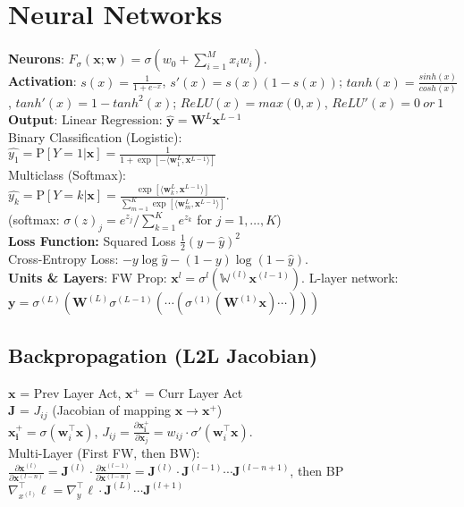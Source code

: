 \section{Neural Networks}
\textbf{Neurons}: $F_\sigma(\mathbf{x};\mathbf{w}) = \sigma(w_0 + \sum_{i=1}^M{x_iw_i})$.\\
\textbf{Activation}: $s(x)=\frac{1}{1+e^{-x}}$, $s'(x)=s(x)(1-s(x))$; $tanh(x) = \tfrac{sinh(x)}{cosh(x)}$, $tanh'(x) = 1 - tanh^2(x)$;  $ReLU(x) = max(0, x)$, $ReLU'(x) = 0\  or\  1$\\
\textbf{Output}: Linear Regression: $\hat{\mathbf{y}} = \mathbf{W}^L\mathbf{x}^{L-1}$\\
Binary Classification (Logistic):\\
$\hat{y_1} = \text{P}[Y=1|\mathbf{x}] = \frac{1}{1 + \exp[-\langle \mathbf{w}_1^L,\mathbf{x}^{L-1}\rangle]}$\\
Multiclass (Softmax):\\
$\hat{y_k} = \text{P}[Y=k|\mathbf{x}]= \frac{\exp[\langle \mathbf{w}_k^L,\mathbf{x}^{L-1}\rangle]}{\sum_{m=1}^{K}{\exp[\langle \mathbf{w}_m^L, \mathbf{x}^{L-1}\rangle]}}$.\\
(softmax: $\sigma(z)_j = e^{z_j}/\sum_{k=1}^K e^{z_k}$ for $j=1,\dots,K$)\\
\textbf{Loss Function:} Squared Loss $\frac{1}{2}(y - \hat{y})^2$\\
Cross-Entropy Loss: $-y \log \hat{y} - (1-y)\log(1-\hat{y})$.\\
\textbf{Units \& Layers}: FW Prop: $\mathbf{x}^{l} = \sigma^{l}\left(\mathbb{W}^{\left(l\right)}\mathbf{x}^{\left(l-1\right)}\right)$. L-layer network: $\mathbf{y}=\sigma^{\left(L\right)}\left(\mathbf{W}^{(L)}\sigma^{(L-1)}\left(\cdots\left(\sigma^{(1)}\left(\mathbf{W}^{(1)}\mathbf{x}\right)\cdots\right)\right)\right)$

\subsection*{Backpropagation (L2L Jacobian)}
$\mathbf{x}$ = Prev Layer Act, $\mathbf{x^+}$ = Curr Layer Act\\$\mathbf{J}$ = $J_{ij}$ (Jacobian of mapping $\mathbf{x}\rightarrow\mathbf{x^+}$)\\ $\mathbf{x_i^+} = \sigma(\mathbf{w}_i^\top\mathbf{x})$, $J_{ij} = \frac{\partial \mathbf{x_i^+}}{\partial \mathbf{x}_j} = w_{ij}\cdot\sigma'(\mathbf{w}_i^\top\mathbf{x})$.\\
Multi-Layer (First FW, then BW):\\
$\frac{\partial\mathbf{x}^{(l)}}{\partial\mathbf{x}^{(l-n)}} = \mathbf{J}^{(l)}\cdot\frac{\partial\mathbf{x}^{(l-1)}}{\partial\mathbf{x}^{(l-n)}}=\mathbf{J}^{(l)}\cdot\mathbf{J}^{(l-1)}\cdots\mathbf{J}^{(l-n+1)}$, then BP $ \nabla_{x^{(l)}}^\top\ell=\nabla_{y}^\top\ell\cdot\mathbf{J}^{(L)}\cdots\mathbf{J}^{(l+1)}$

